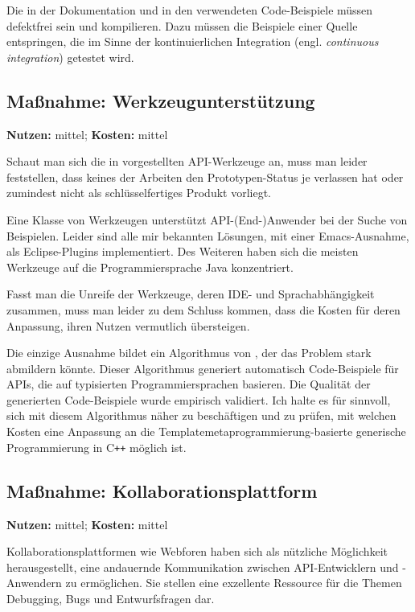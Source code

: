 Die in der Dokumentation und in den  verwendeten Code-Beispiele müssen defektfrei sein und kompilieren. Dazu müssen die Beispiele einer Quelle entspringen, die im Sinne der kontinuierlichen Integration (engl. \textit{continuous integration}) getestet wird.



\subsection{Maßnahme: Werkzeugunterstützung}
\textbf{Nutzen:} mittel; \textbf{Kosten:} mittel

Schaut man sich die in  vorgestellten API-Werkzeuge an, muss man leider feststellen, dass keines der Arbeiten den Prototypen-Status je verlassen hat oder zumindest nicht als schlüsselfertiges Produkt vorliegt.

Eine Klasse von Werkzeugen unterstützt API-(End-)Anwender bei der Suche von Beispielen. Leider sind alle mir bekannten Lösungen, mit einer Emacs-Ausnahme, als Eclipse-Plugins implementiert. Des Weiteren haben sich die meisten Werkzeuge auf die Programmiersprache Java konzentriert.

Fasst man die Unreife der Werkzeuge, deren IDE- und Sprachabhängigkeit zusammen, muss man leider zu dem Schluss kommen, dass die Kosten für deren Anpassung, ihren Nutzen vermutlich übersteigen.

Die einzige Ausnahme bildet ein Algorithmus von \cite{Buse:2012vv}, der das Problem  stark abmildern könnte. Dieser Algorithmus generiert automatisch Code-Beispiele für APIs, die auf typisierten Programmiersprachen basieren. Die Qualität der generierten Code-Beispiele wurde empirisch validiert. Ich halte es für sinnvoll, sich mit diesem Algorithmus näher zu beschäftigen und zu prüfen, mit welchen Kosten eine Anpassung an die Templatemetaprogrammierung-basierte generische Programmierung in C\texttt{++} möglich ist.



\subsection{Maßnahme: Kollaborationsplattform}
\textbf{Nutzen:} mittel; \textbf{Kosten:} mittel

Kollaborationsplattformen wie Webforen haben sich als nützliche Möglichkeit herausgestellt, eine andauernde Kommunikation zwischen API-Entwicklern und -Anwendern zu ermöglichen. Sie stellen eine exzellente Ressource für die Themen Debugging, Bugs und Entwurfsfragen dar. \citep{DaqingHou:2005ba}

